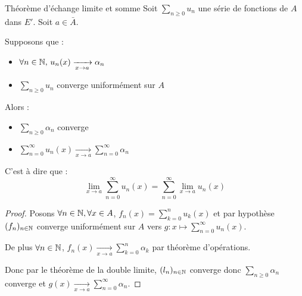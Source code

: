 \begin{theoreme}{Théorème d'échange limite et somme}{}
    Soit $\sum_{n \geqslant 0 } u_n$ une série de fonctions de $A$ dans $E'$. Soit $a \in \bar A$. 

    Supposons que :
    \begin{itemize}
        \item $\forall n \in \mathbb{N}, \, u_n(x) \xrightarrow[x \to a]{} \alpha_n$
        \item $\sum_{n \geqslant 0} u_n$ converge uniformément sur $A$
    \end{itemize}
    Alors : 
    \begin{itemize}
        \item $\displaystyle \sum_{n \geqslant 0} \alpha_n$ converge
        \item $ \displaystyle \sum_{n = 0 }^{\infty    } u_n(x) \xrightarrow[x \to a]{} \sum_{n = 0}^{\infty} \alpha_n$
    \end{itemize} 

    C'est à dire que :
    $$\lim_{x \to a} \sum_{n = 0}^{\infty} u_n(x) = \sum_{n = 0}^{\infty} \lim_{x \to a} u_n(x)$$
\end{theoreme}


\begin{proof}
    Posons $\forall n \in \mathbb{N}, \forall x \in A$, $\displaystyle f_n(x) = \sum_{k = 0}^n u_k(x)$ et par hypothèse 
    $(f_n)_{n \in \mathbb{N}}$ converge uniformément sur $A$ vers $\displaystyle g : x \mapsto \sum_{n = 0}^{\infty} u_n(x)$.

    De plus $\displaystyle \forall n \in \mathbb{N}$, $\displaystyle f_n(x) \xrightarrow[x \to a]{} \sum_{k = 0}^n \alpha_k$ par théorème d'opérations. 

    Donc par le théorème de la double limite, $(l_n)_{n \in \mathbb{N}}$ converge donc $\displaystyle \sum_{n \geqslant 0} \alpha_n$ converge et 
    $\displaystyle g(x) \xrightarrow[x \to a]{} \sum_{n = 0}^{\infty} \alpha_n$.
\end{proof}

